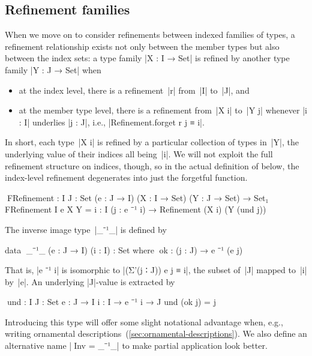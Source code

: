 
\subsection{Refinement families}
\label{sec:refinement-families}

When we move on to consider refinements between indexed families of types, a refinement relationship exists not only between the member types but also between the index sets: a type family |X : I → Set| is refined by another type family |Y : J → Set| when
\begin{itemize}
\item at the index level, there is a refinement~|r| from~|I| to~|J|, and
\item at the member type level, there is a refinement from~|X i| to~|Y j| whenever |i : I| underlies |j : J|, i.e., |Refinement.forget r j ≡ i|.
\end{itemize}
In short, each type~|X i| is refined by a particular collection of types in~|Y|, the underlying value of their indices all being~|i|.
We will not exploit the full refinement structure on indices, though, so in the actual definition of  below, the index-level refinement degenerates into just the forgetful function.
\begin{code}
^^^FRefinement : {I J : Set} (e : J → I) (X : I → Set) (Y : J → Set) → Set₁
FRefinement {I} e X Y = {i : I} (j : e ⁻¹ i) → Refinement (X i) (Y (und j))
\end{code}
The inverse image type~|_⁻¹_| is defined by
\begin{code}
data ^^^_⁻¹_ (e : J → I) (i : I) : Set where
  ^^^ok : (j : J) → e ⁻¹ (e j)
\end{code}
That is, |e ⁻¹ i| is isomorphic to |(Σ'(j ∶ J)) e j ≡ i|, the subset of~|J| mapped to~|i| by~|e|.
An underlying |J|-value is extracted by
\begin{code}
^^^und : {I J : Set} {e : J → I} {i : I} → e ⁻¹ i → J
und (ok j) = j
\end{code}
Introducing this type will offer some slight notational advantage when, e.g., writing ornamental descriptions~(\autoref{sec:ornamental-descriptions}).
We also define an alternative name |^^^Inv = _⁻¹_| to make partial application look better.

